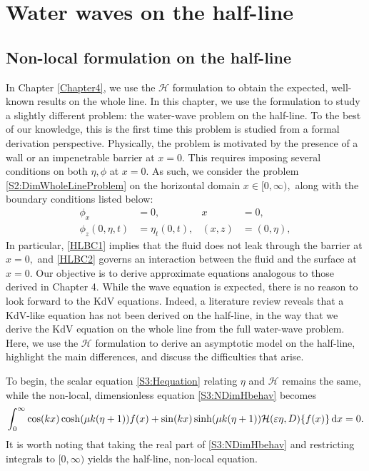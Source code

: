 
\chapter{Water waves on the half-line} %

\label{Chapter5} 

\section{Non-local formulation on the half-line}
In Chapter \ref{Chapter4}, we use the $\mathcal{H}$ formulation to obtain the expected, well-known results on the whole line. In this chapter, we use the formulation to study a slightly different problem: the water-wave problem on the half-line. To the best of our knowledge, this is the first time this problem is studied from a formal derivation perspective. Physically, the problem is motivated by the presence of a wall or an impenetrable barrier at $x = 0.$ This requires imposing several conditions on both $\eta, \phi$ at $x = 0.$ As such, we consider the problem \eqref{S2:DimWholeLineProblem} on the horizontal domain $x\in[0,\infty),$ along with the boundary conditions listed below:
\begin{align}
\phi_{x} &= 0, &x &=0, \label{HLBC1}\\
\phi_{z}(0,\eta,t) &= \eta_t(0,t), &(x,z) &= (0,\eta), \label{HLBC2}
\end{align}
In particular, \eqref{HLBC1} implies that the fluid does not leak through the barrier at $x=0,$ and \eqref{HLBC2} governs an interaction between the fluid and the surface at $x = 0.$ Our objective is to derive approximate equations analogous to those derived in Chapter 4. While the wave equation is expected, there is no reason to look forward to the KdV equations. Indeed, a literature review reveals that a KdV-like equation has not been derived on the half-line, in the way that we derive the KdV equation on the whole line from the full water-wave problem. Here, we use the $\mathcal{H}$ formulation to derive an asymptotic model on the half-line, highlight the main differences, and discuss the difficulties that arise. 

To begin, the scalar equation \eqref{S3:Hequation} relating $\eta$ and $\mathcal{H}$ remains the same, while the non-local, dimensionless equation \eqref{S3:NDimHbehav} becomes
\begin{equation*}%
\int_{0}^{\infty} \cos(kx) \cosh(\mu k(\eta+1)) f(x) + \sin(kx) \sinh(\mu k(\eta+1))\mathcal{H}(\epsilon \eta,D) \{f(x) \} \D x = 0.
\end{equation*} 
It is worth noting that taking the real part of \eqref{S3:NDimHbehav} and restricting integrals to $[0,\infty)$ yields the half-line, non-local equation.

